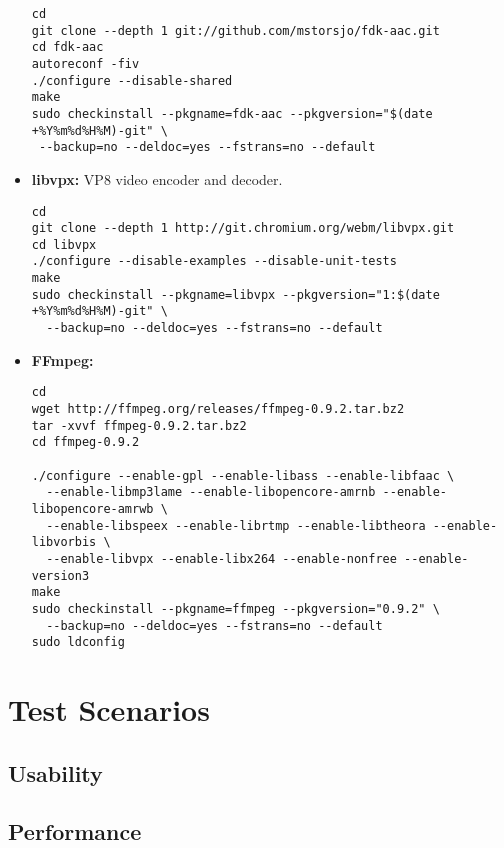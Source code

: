 \begin{itemize}
\begin{code}
\begin{verbatim}
cd
git clone --depth 1 git://github.com/mstorsjo/fdk-aac.git
cd fdk-aac
autoreconf -fiv
./configure --disable-shared
make
sudo checkinstall --pkgname=fdk-aac --pkgversion="$(date +%Y%m%d%H%M)-git" \
 --backup=no --deldoc=yes --fstrans=no --default
\end{verbatim}
\end{code}

\item{\textbf{libvpx:}} VP8 video encoder and decoder.

\begin{code}
\begin{verbatim}
cd
git clone --depth 1 http://git.chromium.org/webm/libvpx.git
cd libvpx
./configure --disable-examples --disable-unit-tests
make
sudo checkinstall --pkgname=libvpx --pkgversion="1:$(date +%Y%m%d%H%M)-git" \
  --backup=no --deldoc=yes --fstrans=no --default  
\end{verbatim}
\end{code}

\item{\textbf{FFmpeg:}}
\begin{code}
\begin{verbatim}
cd
wget http://ffmpeg.org/releases/ffmpeg-0.9.2.tar.bz2
tar -xvvf ffmpeg-0.9.2.tar.bz2 
cd ffmpeg-0.9.2

./configure --enable-gpl --enable-libass --enable-libfaac \
  --enable-libmp3lame --enable-libopencore-amrnb --enable-libopencore-amrwb \
  --enable-libspeex --enable-librtmp --enable-libtheora --enable-libvorbis \
  --enable-libvpx --enable-libx264 --enable-nonfree --enable-version3
make
sudo checkinstall --pkgname=ffmpeg --pkgversion="0.9.2" \
  --backup=no --deldoc=yes --fstrans=no --default
sudo ldconfig
\end{verbatim}
\end{code}

\end{itemize}
\section{Test Scenarios\label{sec:eval__te_sc}}
	\subsection{Usability\label{seq:eval_usab}}
	
	\subsection{Performance\label{seq:eval_perf}}